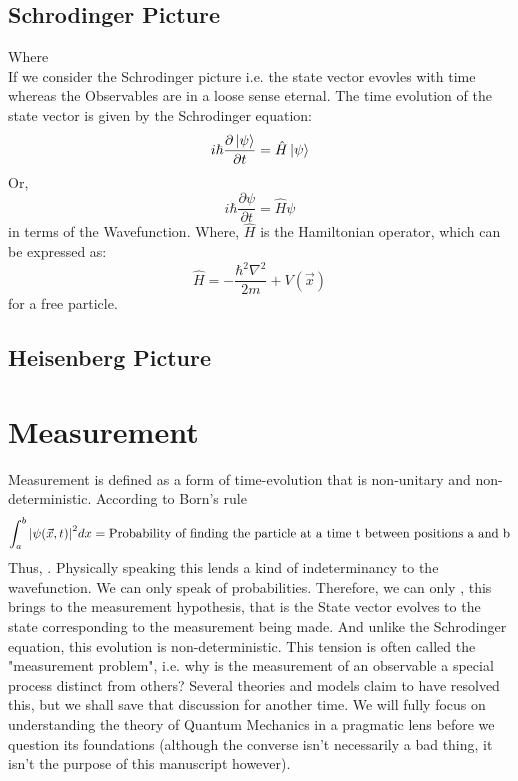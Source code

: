 \subsection{Schrodinger Picture}
Where\\
If we consider the Schrodinger picture i.e. the state vector evovles with time whereas the Observables are in a loose sense eternal. The time evolution of the state vector is given by the Schrodinger equation:
\begin{equation}
	i \hbar \frac{\partial \ket{\psi}}{\partial t} = \hat{H} \ket{\psi}
\end{equation}
Or,
\begin{equation}
	i \hbar \frac{\partial \psi}{\partial t} = \hat{H} \psi
\end{equation}
in terms of the Wavefunction. Where, $\hat{H}$ is the Hamiltonian operator, which can be expressed as:
\begin{equation}
	\hat{H} = -\frac{\hbar^{2} \nabla^2}{2m} + V(\vec{x})
\end{equation}
for a free particle. 

\subsection{Heisenberg Picture}

\section{Measurement}
Measurement is defined as a form of time-evolution that is non-unitary and non-deterministic. 
According to Born's rule
\begin{equation}
	\int_{a}^{b} \abs{\psi(\vec{x}, t)}^{2} dx = \text{Probability of finding the particle at a time t between positions a and b}
\end{equation}
Thus, . Physically speaking this lends a kind of indeterminancy to the wavefunction. We can only speak of probabilities. Therefore, we can only , this brings to the measurement hypothesis, that is the State vector evolves to the state corresponding to the measurement being made. And unlike the Schrodinger equation, this evolution is non-deterministic. This tension is often called the "measurement problem", i.e. why is the measurement of an observable a special process distinct from others? Several theories and models claim to have resolved this, but we shall save that discussion for another time. We will fully focus on understanding the theory of Quantum Mechanics in a pragmatic lens before we question its foundations (although the converse isn't necessarily a bad thing, it isn't the purpose of this manuscript however).

